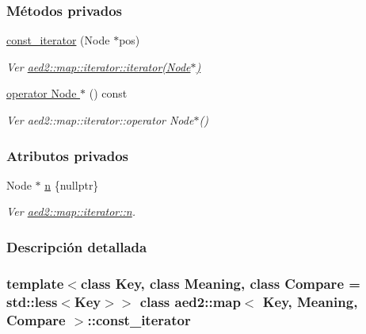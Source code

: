 \subsubsection*{Métodos privados}
\begin{DoxyCompactItemize}
\item 
\hyperlink{classaed2_1_1map_1_1const__iterator_a195d395708167dca23f9ce49f7c604f3_a195d395708167dca23f9ce49f7c604f3}{const\+\_\+iterator} (Node $\ast$pos)
\begin{DoxyCompactList}\small\item\em Ver \hyperlink{classaed2_1_1map_1_1iterator_ab0ea21abcb32b6d5a72cf341b9029838_ab0ea21abcb32b6d5a72cf341b9029838}{aed2\+::map\+::iterator\+::iterator(\+Node$\ast$)} \end{DoxyCompactList}\item 
\hyperlink{classaed2_1_1map_1_1const__iterator_ab408eb7252948dd8b8df540303ab5906_ab408eb7252948dd8b8df540303ab5906}{operator Node $\ast$} () const
\begin{DoxyCompactList}\small\item\em Ver aed2\+::map\+::iterator\+::operator Node$\ast$() \end{DoxyCompactList}\end{DoxyCompactItemize}
\subsubsection*{Atributos privados}
\begin{DoxyCompactItemize}
\item 
Node $\ast$ \hyperlink{classaed2_1_1map_1_1const__iterator_a921e123f9c7f94610cf9fee3ab55d277_a921e123f9c7f94610cf9fee3ab55d277}{n} \{nullptr\}
\begin{DoxyCompactList}\small\item\em Ver \hyperlink{classaed2_1_1map_1_1iterator_adf8633ef71bb6c1fc01c0abe8728fd93_adf8633ef71bb6c1fc01c0abe8728fd93}{aed2\+::map\+::iterator\+::n}. \end{DoxyCompactList}\end{DoxyCompactItemize}


\subsubsection{Descripción detallada}
\subsubsection*{template$<$class Key, class Meaning, class Compare = std\+::less$<$\+Key$>$$>$\newline
class aed2\+::map$<$ Key, Meaning, Compare $>$\+::const\+\_\+iterator}

